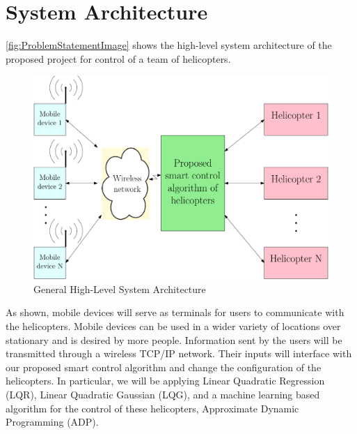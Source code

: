 \documentclass[12pt]{article} %
\begin{document}
\section{System Architecture}
%
\autoref{fig:ProblemStatementImage} shows the high-level system architecture of the proposed project for control of a team of helicopters.  %
%
\begin{figure}
  \centering
  \begin{mdframed}[backgroundcolor=yellow!20, roundcorner=7pt,outerlinewidth=1.2pt,outerlinecolor=blue!50]
  \includegraphics[scale=0.749]{figs/ipe/ProblemStatementImage}
  \end{mdframed}
  \caption{General High-Level System Architecture}
  \label{fig:ProblemStatementImage}
\end{figure}
%
As shown, mobile devices will serve as terminals for users to communicate with the helicopters.  Mobile devices can be used in a wider variety of locations over stationary and is desired by more people.  Information sent by the users will be transmitted through a wireless TCP/IP network.  Their inputs will interface with our proposed smart control algorithm and change the configuration of the helicopters.  In particular, we will be applying Linear Quadratic Regression (LQR), Linear Quadratic Gaussian (LQG), and a machine learning based algorithm for the control of these helicopters, Approximate Dynamic Programming (ADP).  

\end{document}
